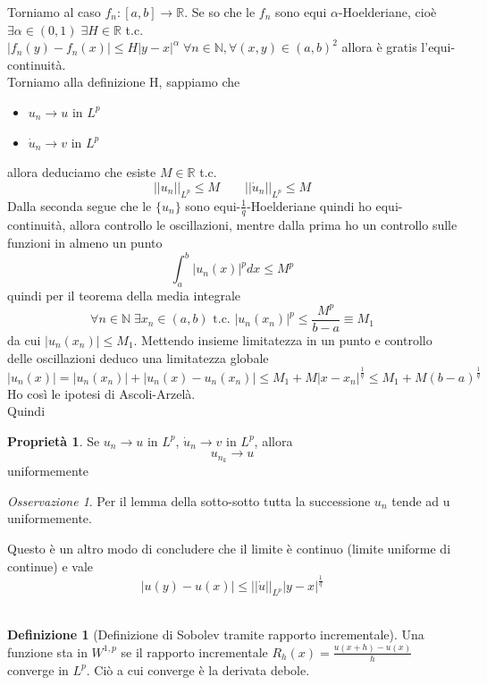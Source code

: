 \documentclass[a4paper]{book}
\theoremstyle{definition}
\newtheorem{defn}{Definizione}
\theoremstyle{remark}
\newtheorem{oss}{Osservazione}
\theoremstyle{definition}
\newtheorem{prop}{Proprietà}
\newcommand{\bbr}{\mathbb{R}}
\newcommand{\bbn}{\mathbb{N}}
\begin{document}
Torniamo al caso $f_n:[a,b]\to \bbr$. Se so che le $f_n$ sono equi $\alpha$-Hoelderiane, cioè $\exists\alpha \in (0,1)\; \exists H \in \bbr$ t.c. $|f_n(y)-f_n(x)| \le H |y-x|^\alpha \; \forall n \in\bbn, \forall (x, y)\in (a,b)^2$ allora è gratis l'equi-continuità.\\
Torniamo alla definizione H, sappiamo che 
\begin{itemize}
	\item $u_n \to u$ in $L^p$
	\item $\dot{u}_n \to v$ in $L^p$
\end{itemize}
allora deduciamo che esiste $M \in \bbr$ t.c. 
$$||u_n||_{L^p}\le M  \qquad ||\dot{u}_n||_{L^p}\le M$$
Dalla seconda segue che le $\{u_n\}$ sono equi-$\frac1q$-Hoelderiane quindi ho equi-continuità, allora controllo le oscillazioni, mentre dalla prima ho un controllo sulle funzioni in almeno un punto
$$\int_a^b |u_n(x)|^pdx \le M^p$$
quindi per il teorema della media integrale
$$\forall n \in \bbn \; \exists x_n \in (a,b) \text{ t.c. } |u_n(x_n)|^p \le \frac{M^p}{b-a} \equiv M_1$$ da cui $|u_n(x_n)| \le M_1$. Mettendo insieme limitatezza in un punto e controllo delle oscillazioni deduco una limitatezza globale
$$|u_n(x)| = |u_n(x_n)| + |u_n(x)- u_n(x_n)|\le M_1 + M |x-x_n|^\frac1q \le M_1 + M (b-a)^\frac1q$$
Ho così le ipotesi di Ascoli-Arzelà.
\\
Quindi
\begin{prop}
	Se $u_n \to u$ in $L^p$, $\dot{u}_n \to v$ in $L^p$, allora $$u_{n_k}\to u$$ uniformemente
\end{prop}

\begin{oss}
	Per il lemma della sotto-sotto tutta la successione $u_n$ tende ad u uniformemente.
\end{oss}

Questo è un altro modo di concludere che il limite è continuo (limite uniforme di continue) e vale
$$|u(y)-u(x)| \le ||\dot{u}||_{L^p}|y-x|^\frac1q$$
\\
\begin{defn}[Definizione di Sobolev tramite rapporto incrementale]
	Una funzione sta in $W^{1,p}$ se il rapporto incrementale $R_h(x) = \frac{u(x+h)-u(x)}{h}$ converge in $L^p$. Ciò a cui converge è la derivata debole.
\end{defn}
\end{document}
